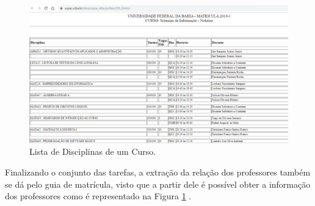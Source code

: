 \documentclass[12pt, a4paper]{report}
\begin{document}
\begin{figure}[ht!]
\centering
\includegraphics[scale=0.8]{disciplinas.png}
\caption{Lista de Disciplinas de um Curso.}
\label{fig:disciplinas}
\end{figure}

Finalizando o conjunto das tarefas, a extração da relação dos professores também se dá pelo guia de matrícula, visto que a partir dele é possível obter a informação dos professores como é representado na Figura \ref{fig:disciplinas} . 
\end{document}
